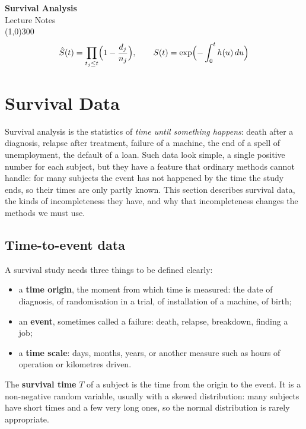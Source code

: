 \documentclass[11pt,a4paper]{article}
\numberwithin{equation}{section}
\theoremstyle{definition}
\begin{document}
\begin{titlepage}
\thispagestyle{empty}
\begin{center}
\vspace*{3cm}
{\Huge\bfseries Survival Analysis}\\[1.2cm]
{\large Lecture Notes}\\[2.5cm]
\line(1,0){300}\\[1.5cm]
$$\hat S(t) = \prod_{t_j \le t}\Bigl(1 - \frac{d_j}{n_j}\Bigr), \qquad S(t) = \exp\Bigl(-\int_0^t h(u)\,du\Bigr)$$
\end{center}
\end{titlepage}

\tableofcontents
\thispagestyle{empty}
\clearpage
\setcounter{page}{1}

\section{Survival Data}
\label{sec:data}

Survival analysis is the statistics of \emph{time until something happens}: death after a diagnosis, relapse after treatment, failure of a machine, the end of a spell of unemployment, the default of a loan. Such data look simple, a single positive number for each subject, but they have a feature that ordinary methods cannot handle: for many subjects the event has not
happened by the time the study ends, so their times are only partly known. This section describes survival data, the kinds of incompleteness they have, and why that incompleteness changes the methods we must use.

\subsection{Time-to-event data}
\label{ssec:timetoevent}

A survival study needs three things to be defined clearly:
\begin{itemize}
\item a \textbf{time origin}, the moment from which time is measured: the date of diagnosis, of randomisation in a trial, of installation of a machine, of birth;
\item an \textbf{event}, sometimes called a failure: death, relapse, breakdown, finding a job;
\item a \textbf{time scale}: days, months, years, or another measure such as hours of operation or kilometres driven.
\end{itemize}
The \textbf{survival time} $T$ of a subject is the time from the origin to the event. It is a non-negative random variable, usually with a skewed distribution: many subjects have short times and a few very long ones, so the normal distribution is rarely appropriate.
\end{document}
